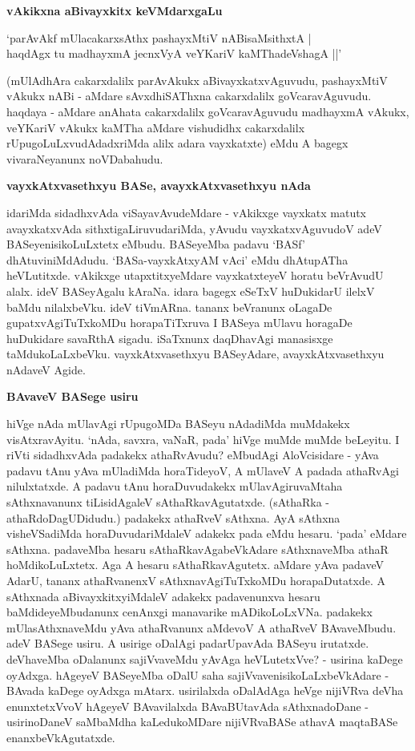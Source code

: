 \noindent
\textbf{vAkikxna aBivayxkitx keVMdarxgaLu}\label{page8}

\begin{shloka}
`parAvAkf mUlacakarxsAthx pashayxMtiV nABisaMsithxtA |\\\label{8}
haqdAgx tu madhayxmA jecnxVyA veYKariV kaMThadeVshagA ||'
\end{shloka}

(mUlAdhAra cakarxdalilx parAvAkukx aBivayxkatxvAguvudu, pashayxMtiV vAkukx nABi - aMdare sAvxdhiSAThxna cakarxdalilx goVcaravAguvudu. haqdaya - aMdare anAhata cakarxdalilx goVcaravAguvudu madhayxmA vAkukx, veYKariV vAkukx kaMTha aMdare vishudidhx cakarxdalilx rUpugoLuLxvudAdadxriMda alilx adara vayxkatxte) eMdu A bagegx vivaraNeyanunx noVDabahudu.

\noindent
\textbf{vayxkAtxvasethxyu BASe, avayxkAtxvasethxyu nAda}\label{page8}

idariMda sidadhxvAda viSayavAvudeMdare - vAkikxge vayxkatx matutx avayxkatxvAda sithxtigaLiruvudariMda, yAvudu vayxkatxvAguvudoV adeV BASeyenisikoLuLxtetx eMbudu. BASeyeMba padavu `BASf' dhAtuviniMdAdudu. `BASa-vayxkAtxyAM vAci' eMdu dhAtupATha heVLutitxde. vAkikxge utapxtitxyeMdare vayxkatxteyeV horatu beVrAvudU alalx. ideV BASeyAgalu kAraNa. idara bagegx eSeTxV huDukidarU ilelxV baMdu nilalxbeVku. ideV tiVmARna. tananx beVranunx oLagaDe gupatxvAgiTuTxkoMDu horapaTiTxruva I BASeya mUlavu horagaDe huDukidare savaRthA sigadu. iSaTxnunx daqDhavAgi manasisxge taMdukoLaLxbeVku. vayxkAtxvasethxyu BASeyAdare, avayxkAtxvasethxyu nAdaveV Agide.

\noindent
\textbf{BAvaveV BASege usiru}\label{page9}

hiVge nAda mUlavAgi rUpugoMDa BASeyu nAdadiMda muMdakekx visAtxravAyitu. `nAda, savxra, vaNaR, pada' hiVge muMde muMde beLeyitu. I riVti sidadhxvAda padakekx athaRvAvudu? eMbudAgi AloVcisidare - yAva padavu tAnu yAva mUladiMda horaTideyoV, A mUlaveV A padada athaRvAgi nilulxtatxde. A padavu tAnu horaDuvudakekx mUlavAgiruvaMtaha sAthxnavanunx tiLisidAgaleV sAthaRkavAgutatxde. (sAthaRka - athaRdoDagUDidudu.) padakekx athaRveV sAthxna. AyA sAthxna visheVSadiMda horaDuvudariMdaleV adakekx pada eMdu hesaru. `pada' eMdare sAthxna. padaveMba hesaru sAthaRkavAgabeVkAdare sAthxnaveMba athaR hoMdikoLuLxtetx. Aga A hesaru sAthaRkavAgutetx. aMdare yAva padaveV AdarU, tananx athaRvanenxV sAthxnavAgiTuTxkoMDu horapaDutatxde. A sAthxnada aBivayxkitxyiMdaleV adakekx padavenunxva hesaru baMdideyeMbudanunx cenAnxgi manavarike mADikoLoLxVNa. padakekx mUlasAthxnaveMdu yAva athaRvanunx aMdevoV A athaRveV BAvaveMbudu. adeV BASege usiru. A usirige oDalAgi padarUpavAda BASeyu irutatxde. deVhaveMba oDalanunx sajiVvaveMdu yAvAga heVLutetxVve? - usirina kaDege oyAdxga. hAgeyeV BASeyeMba oDalU saha sajiVvavenisikoLaLxbeVkAdare - BAvada kaDege oyAdxga mAtarx. usirilalxda oDalAdAga heVge nijiVRva deVha enunxtetxVvoV hAgeyeV BAvavilalxda BAvaBUtavAda sAthxnadoDane - usirinoDaneV saMbaMdha kaLedukoMDare nijiVRvaBASe athavA maqtaBASe enanxbeVkAgutatxde.

